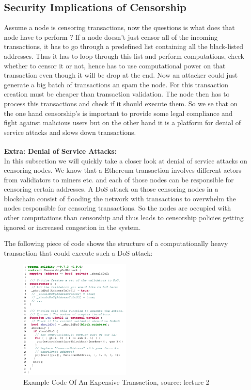 \documentclass{article}
\begin{document}
\subsection{Security Implications of Censorship}
Assume a node is censoring transactions, now the questions is what does that node have to perform ? If a node doesn't just censor all of the incoming transactions, it has to go through a predefined list containing all the black-listed addresses. Thus it has to loop through this list and perform computations, check whether to censor it or not, hence has to use computational power on that transaction even though it will be drop at the end. Now an attacker could just generate a big batch of transactions an spam the node. For this transaction creation must be cheaper than transaction validation. The node then has to process this transactions and check if it should execute them. So we se that on the one hand censorship's is important to provide some legal compliance and fight against malicious users but on the other hand it is a platform for denial of service attacks and slows down transactions.
\\
\\
\textbf{Extra: Denial of Service Attacks:}\\
In this subsection we will quickly take a closer look at denial of service attacks on censoring nodes. We know that a Ethereum transaction involves different actors from validiators to miners etc. and each of those nodes can be responsible for censoring certain addresses. A DoS attack on those censoring nodes in a blockchain consist of flooding the network with transactions to overwhelm the nodes responsible for censoring transactions. So the nodes are occupied with other computations than censorship and thus leads to censorship policies getting ignored or increased  congestion in the system.

The following piece of code shows the structure of a computationally heavy transaction that could execute such a DoS attack:

\begin{figure}[h]
    \centering
    \includegraphics[width=0.5\textwidth]{dos-attack.png} %
    \caption{Example Code Of An Expensive Transaction, \scriptsize{source: lecture 2}}
    \label{fig:DoS-attack}
\end{figure}
\end{document}
